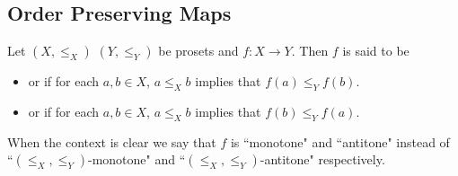 \documentclass{book}
\begin{document}
	
	
	
	
	
	
	
	
	
	
	
	
	
	
	
	
	
	
	
	
	
	
	
	
	
	
	
	
	
	
	
	
	
	
	
	
	
	
	
	
	
	\subsection{Order Preserving Maps}
	
	\begin{defn} 
		Let $(X, \leq_X)$ $(Y, \leq_Y)$ be prosets and $f:X \rightarrow Y$. Then $f$ is said to be
		\begin{itemize}
			\item {} or  if for each $a,b \in X$, $a \leq_X b$ implies that $f(a) \leq_Y f(b)$. 
			\item {} or  if for each $a,b \in X$, $a \leq_X b$ implies that $f(b) \leq_Y f(a)$. 
		\end{itemize}
	\end{defn}
	
	\begin{note}
		When the context is clear we say that $f$ is ``monotone" and ``antitone" instead of ``$(\leq_X, \leq_Y)$-monotone" and ``$(\leq_X, \leq_Y)$-antitone" respectively.
	\end{note}
	
\end{document}

